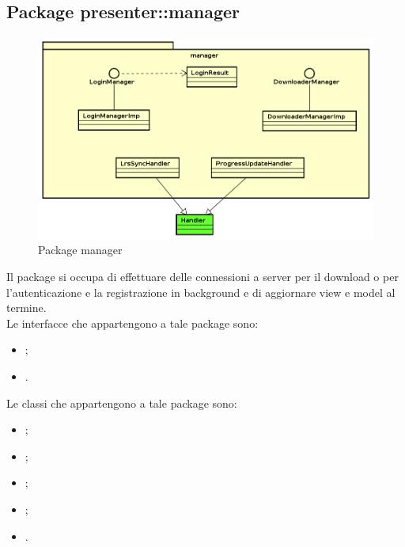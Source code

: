 \documentclass[../Tesi.tex]{subfiles}
\begin{document}
	\subsection{Package presenter::manager}
		\begin{figure}[H]
			\centering
			\includegraphics[scale=0.6]{images/package_diagrams/manager}
				\caption{Package manager}
			\label{fig:StrutturaMVP}
		\end{figure}
		Il package  si occupa di effettuare delle connessioni a server per il download o per l'autenticazione e la registrazione in background e di aggiornare view e model al termine. \\
		Le interfacce che appartengono a tale package sono:
		\begin{itemize}
			\item {};
			\item {}.
		\end{itemize}
		Le classi che appartengono a tale package sono:
		\begin{itemize}
			\item {};
			\item {};
			\item {};
			\item {};
			\item {}.
		\end{itemize}
\end{document}
